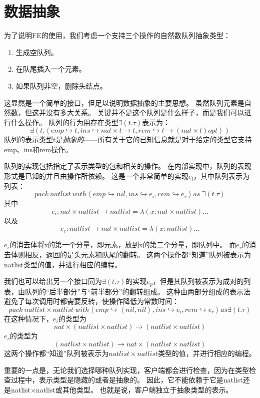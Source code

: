 ﻿\section{数据抽象}

为了说明FE的使用，我们考虑一个支持三个操作的自然数队列抽象类型：
\begin{enumerate}

\item 生成空队列。
\item 在队尾插入一个元素。
\item 如果队列非空，删除头结点。

\end{enumerate}

这显然是一个简单的接口，但足以说明数据抽象的主要思想。
虽然队列元素是自然数，但这并没有多大关系。
关键并不是这个队列是什么样子，而是我们可以进行什么操作。
队列的行为用存在类型$\exists(t.\tau)$表示为：
$$\exists(t.\left \langle emp \hookrightarrow t,ins \hookrightarrow nat \times t \rightarrow t,
rem \hookrightarrow t \rightarrow (nat \times t)opt \right \rangle)$$
队列的表示类型t是\textit{抽象的}——所有关于它的已知信息就是对于给定的类型它支持emp、ins和rem操作。

队列的实现包括指定了表示类型的包和相关的操作。
在内部实现中，队列的表现形式是已知的并且由操作所依赖。
这是一个非常简单的实现$e_{l}$，其中队列表示为列表：
$$pack\ natlist\ with \left \langle emp \hookrightarrow nil,ins \hookrightarrow e_{i},rem \hookrightarrow e_{r} \right \rangle 
as\ \exists(t.\tau)$$
其中
$$e_{i}:nat \times natlist \rightarrow natlist=\lambda(x:nat \times natlist)...$$
以及
$$e_{r}:natlist \rightarrow nat \times natlist=\lambda(x:natlist)...$$

$e_{i}$的消去体将x的第一个分量，即元素，放到x的第二个分量，即队列中。
而$e_{r}$的消去体则相反，返回的是头元素和队尾的翻转。
这两个操作都“知道”队列被表示为natlist类型的值，并进行相应的编程。

我们也可以给出另一个接口同为$\exists(t.\tau)$的实现$e_{p}$，但是其队列被表示为成对的列表，由队列的“后半部分”与“前半部分”的翻转组成。
这种由两部分组成的表示法避免了每次调用时都需要反转，使操作降低为常数时间：
$$pack\ natlist \times natlist\ with \left \langle emp \hookrightarrow \left \langle nil,nil \right \rangle,
ins \hookrightarrow e_{i},rem \hookrightarrow e_{r} \right \rangle as \exists(t.\tau)$$
在这种情况下，$e_{i}$的类型为
$$nat \times (natlist \times natlist) \rightarrow (natlist \times natlist)$$
$e_{r}$的类型为
$$(natlist \times natlist) \rightarrow nat \times (natlist \times natlist)$$
这两个操作都“知道”队列被表示为$natlist \times natlist$类型的值，并进行相应的编程。

重要的一点是，无论我们选择哪种队列实现，客户端都会进行检查，因为在类型检查过程中，表示类型是隐藏的或者是抽象的。
因此，它不能依赖于它是natlist还是natlist×natlist或其他类型。
也就是说，客户端独立于抽象类型的表示。
